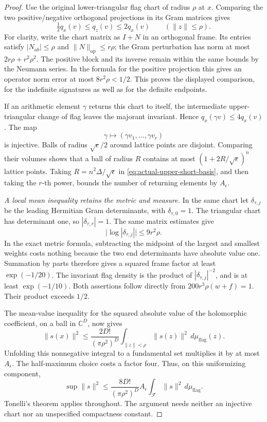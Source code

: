 \begin{proof}
Use the original lower-triangular flag chart of radius $\rho$ at
$x$.  Comparing the two positive/negative orthogonal projections
in its Gram matrices gives
\[
 \tfrac12q_x(v)\le q_z(v)\le2q_x(v)
       \qquad(\|z\|\le\rho).
\]
For clarity, write the chart matrix as $I+N$ in an orthogonal frame.
Its entries satisfy $|N_{ab}|\le\rho$ and
$\|N\|_{\mathrm{op}}\le r\rho$; the Gram perturbation has norm
at most $2r\rho+r^2\rho^2$.  The positive block and its inverse
remain within the same bounds by the Neumann series.  In the
formula for the positive projection this gives an operator norm
error at most $8r^2\rho<1/2$.  This proves the displayed
comparison, for the indefinite signatures as well as for the
definite endpoints.

If an arithmetic element $\gamma$ returns this chart to itself,
the intermediate upper-triangular change of flag leaves the
majorant invariant.  Hence
$q_x(\gamma v)\le4q_x(v)$.  The map
\[
               \gamma\longmapsto(\gamma v_1,\ldots,\gamma v_r)
\]
is injective.  Balls of radius $\sqrt\epsilon/2$ around lattice
points are disjoint.  Comparing their volumes shows that a ball
of radius $R$ contains at most
$(1+2R/\sqrt\epsilon)^n$ lattice points.  Taking
$R=n^2\Delta/\sqrt\epsilon$ in
\eqref{eq:actual-upper-short-basis}, and then taking the $r$-th
power, bounds the number of returning elements by $A_\epsilon$.

\emph{A local mean inequality retains the metric and measure.}
In the same chart let $\delta_{\tau,j}$ be the leading Hermitian
Gram determinants, with $\delta_{\tau,0}=1$.
The triangular chart has determinant one, so
$|\delta_{\tau,r}|=1$.  The same matrix estimates give
\[
        \bigl|\log|\delta_{\tau,j}|\bigr|\le9r^2\rho.
\]
In the exact metric formula, subtracting the midpoint of the
largest and smallest weights costs nothing because the two end
determinants have absolute value one.  Summation by parts therefore
gives a squared frame factor at least $\exp(-1/20)$.
The invariant flag density is the product of
$|\delta_{\tau,j}|^{-2}$, and is at least $\exp(-1/10)$.
Both assertions follow directly from
$200r^3\rho(w+f)=1$.  Their product exceeds $1/2$.

The mean-value inequality for the squared absolute value of the
holomorphic coefficient, on a ball in $\mathbb C^D$, now gives
\[
 \|s(x)\|^2\le
 \frac{2D!}{(\pi\rho^2)^D}
           \int_{\|z\|<\rho}\|s(z)\|^2\,d\mu_{\mathrm{flag}}(z).
\]
Unfolding this nonnegative integral to a fundamental set multiplies
it by at most $A_\epsilon$.  The half-maximum choice costs a factor
four.  Thus, on this uniformizing component,
\begin{equation}\label{eq:actual-upper-raw}
 \sup\|s\|^2\le
 \frac{8D!}{(\pi\rho^2)^D}A_\epsilon
       \int_{\mathcal F}\|s\|^2\,d\mu_{\mathrm{flag}}.
\end{equation}
Tonelli's theorem applies throughout.  The argument needs neither
an injective chart nor an unspecified compactness constant.


\end{proof}
